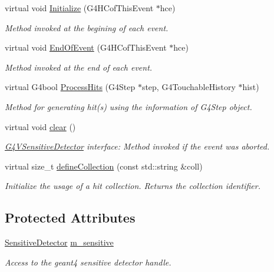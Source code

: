 \begin{DoxyCompactItemize}
virtual void \hyperlink{class_d_d4hep_1_1_simulation_1_1_geant4_sens_det_a64413a736de8cc5d193bf097595ae5d4}{Initialize} (G4HCofThisEvent $\ast$hce)
\begin{DoxyCompactList}\small\item\em Method invoked at the begining of each event. \item\end{DoxyCompactList}\item 
virtual void \hyperlink{class_d_d4hep_1_1_simulation_1_1_geant4_sens_det_a37c49991840451bda97aa4640fcd1b4c}{EndOfEvent} (G4HCofThisEvent $\ast$hce)
\begin{DoxyCompactList}\small\item\em Method invoked at the end of each event. \item\end{DoxyCompactList}\item 
virtual G4bool \hyperlink{class_d_d4hep_1_1_simulation_1_1_geant4_sens_det_aafdd578f5e7d1ac5885a715b9a101567}{ProcessHits} (G4Step $\ast$step, G4TouchableHistory $\ast$hist)
\begin{DoxyCompactList}\small\item\em Method for generating hit(s) using the information of G4Step object. \item\end{DoxyCompactList}\item 
virtual void \hyperlink{class_d_d4hep_1_1_simulation_1_1_geant4_sens_det_a6840565286dac4c3b705d86589010e37}{clear} ()
\begin{DoxyCompactList}\small\item\em \hyperlink{class_g4_v_sensitive_detector}{G4VSensitiveDetector} interface: Method invoked if the event was aborted. \item\end{DoxyCompactList}\item 
virtual size\_\-t \hyperlink{class_d_d4hep_1_1_simulation_1_1_geant4_sens_det_af75a2eab653115fffe05ccb32828a461}{defineCollection} (const std::string \&coll)
\begin{DoxyCompactList}\small\item\em Initialize the usage of a hit collection. Returns the collection identifier. \item\end{DoxyCompactList}\end{DoxyCompactItemize}
\subsection*{Protected Attributes}
\begin{DoxyCompactItemize}
\item 
\hyperlink{class_d_d4hep_1_1_geometry_1_1_sensitive_detector}{SensitiveDetector} \hyperlink{class_d_d4hep_1_1_simulation_1_1_geant4_sens_det_a0790d04fc8724269797452cb89b91d39}{m\_\-sensitive}
\begin{DoxyCompactList}\small\item\em Access to the geant4 sensitive detector handle. \item\end{DoxyCompactList}\end{DoxyCompactItemize}



